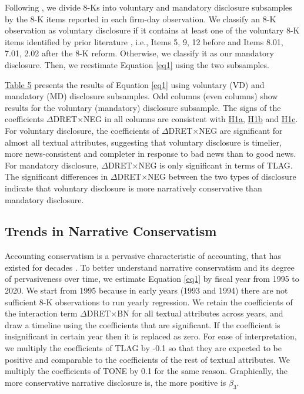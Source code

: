 \documentclass[letterpaper,12pt]{article}
\begin{document}
\begin{spacing}{1.5}
Following , we divide 8-Ks into voluntary and mandatory disclosure subsamples by the 8-K items reported in each firm-day observation. We classify an 8-K observation as voluntary disclosure if it contains at least one of the voluntary 8-K items identified by prior literature \cite{lermanNewForm8K2010, heMeasuringDisclosureUsing2020}, i.e., Items 5, 9, 12 before and Items 8.01, 7.01, 2.02 after the 8-K reform. Otherwise, we classify it as our mandatory disclosure. Then, we reestimate Equation \eqref{eq1} using the two subsamples. 

\hyperref[T5]{Table 5} presents the results of Equation \eqref{eq1} using voluntary (VD) and mandatory (MD) disclosure subsamples. Odd columns (even columns) show results for the voluntary (mandatory) disclosure subsample. The signs of the coefficients $\Delta$DRET$\times$NEG in all columns are consistent with \hyperref[hyp:h1a]{H1a}, \hyperref[hyp:h1b]{H1b} and \hyperref[hyp:h1c]{H1c}. For voluntary disclosure, the coefficients of $\Delta$DRET$\times$NEG are significant for almost all textual attributes, suggesting that voluntary disclosure is timelier, more news-consistent and completer in response to bad news than to good news. For mandatory disclosure, $\Delta$DRET$\times$NEG is only significant in terms of TLAG. The significant differences in $\Delta$DRET$\times$NEG between the two types of disclosure indicate that voluntary disclosure is more narratively conservative than mandatory disclosure.

\subsection{Trends in Narrative Conservatism}
\noindent Accounting conservatism is a pervasive characteristic of accounting, that has existed for decades \cite{sivakumarEnforceableAccountingRules2003}. To better understand narrative conservatism and its degree of pervasiveness over time, we estimate Equation \eqref{eq1} by fiscal year from 1995 to 2020. We start from 1995 because in early years (1993 and 1994) there are not sufficient 8-K observations to run yearly regression. We retain the coefficients of the interaction term $\Delta$DRET$\times$BN for all textual attributes across years, and draw a timeline using the coefficients that are significant. If the coefficient is insignificant in certain year then it is replaced as zero. For ease of interpretation, we multiply the coefficients of TLAG by -0.1 so that they are expected to be positive and comparable to the coefficients of the rest of textual attributes. We multiply the coefficients of TONE by 0.1 for the same reason. Graphically, the more conservative narrative disclosure is, the more positive is $\beta_3$.


\end{spacing}
\end{document}
